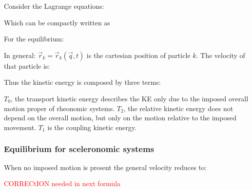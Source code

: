 \documentclass[10pt,a4paper]{scrartcl}
\begin{document}
\begin{multicols*}{2}
Consider the Lagrange equations:


Which can be compactly written as 


For the equilibrium:


In general: $\vec{r}_k=\vec{r}_k(\vec{q},t)$ is the cartesian position of particle $k$. The velocity of that particle is:


Thus the kinetic energy is composed by three terms:


$T_0$, the transport kinetic energy describes the KE only due to the imposed overall motion proper of rheonomic systems. $T_2$, the relative kinetic energy does not depend on the overall motion, but only on the motion relative to the imposed movement. $T_1$ is the coupling kinetic energy.

\subsubsection{Equilibrium for sceleronomic systems}

When no imposed motion is present the general velocity reduces to:

\textcolor{red}{CORRECtION needed in next formula}


\end{multicols*}
\end{document}
